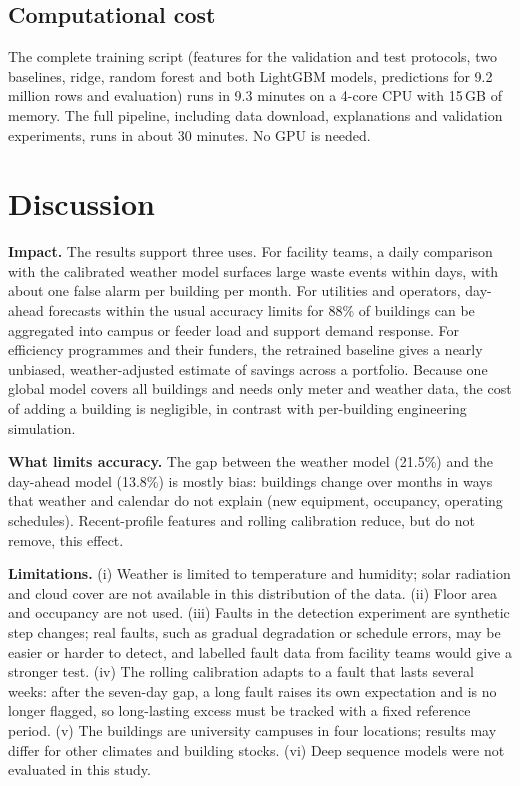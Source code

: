 \documentclass[11pt,a4paper]{article}
\begin{document}
\subsection{Computational cost}
The complete training script (features for the validation and test protocols, two baselines, ridge, random forest
and both LightGBM models, predictions for 9.2 million rows and evaluation) runs in 9.3 minutes on a 4-core CPU with
15\,GB of memory. The full pipeline, including data download, explanations and validation experiments, runs in about
30 minutes. No GPU is needed.

\section{Discussion}\label{sec:discussion}

\textbf{Impact.} The results support three uses. For facility teams, a daily comparison with the calibrated weather
model surfaces large waste events within days, with about one false alarm per building per month. For utilities and
operators, day-ahead forecasts within the usual accuracy limits for 88\% of buildings can be aggregated into campus
or feeder load and support demand response. For efficiency programmes and their funders, the retrained baseline
gives a nearly unbiased, weather-adjusted estimate of savings across a portfolio. Because one global model covers
all buildings and needs only meter and weather data, the cost of adding a building is negligible, in contrast with
per-building engineering simulation.

\textbf{What limits accuracy.} The gap between the weather model (21.5\%) and the day-ahead model (13.8\%) is mostly
bias: buildings change over months in ways that weather and calendar do not explain (new equipment, occupancy,
operating schedules). Recent-profile features and rolling calibration reduce, but do not remove, this effect.

\textbf{Limitations.} (i) Weather is limited to temperature and humidity; solar radiation and cloud cover are not
available in this distribution of the data. (ii) Floor area and occupancy are not used. (iii) Faults in the detection
experiment are synthetic step changes; real faults, such as gradual degradation or schedule errors, may be easier or
harder to detect, and labelled fault data from facility teams would give a stronger test. (iv) The rolling calibration
adapts to a fault that lasts several weeks: after the seven-day gap, a long fault raises its own expectation and is
no longer flagged, so long-lasting excess must be tracked with a fixed reference period. (v) The buildings are
university campuses in four locations; results may differ for other climates and building stocks. (vi) Deep
sequence models \citep{hochreiter1997lstm,lim2021tft} were not evaluated in this study.
\end{document}
